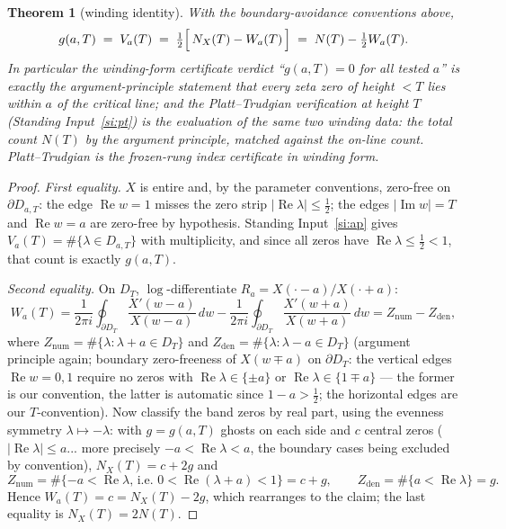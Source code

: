 \documentclass[11pt]{article}
\newtheorem{theorem}{Theorem}[section]
\theoremstyle{definition}
\theoremstyle{remark}
\newcommand{\re}{\operatorname{Re}}
\newcommand{\im}{\operatorname{Im}}
\begin{document}
\begin{theorem}[winding identity]\label{thm:winding-identity}
With the boundary-avoidance conventions above,
\[
g(a,T)\;=\;V_a(T)\;=\;\tfrac12\Bigl[\,N_X(T)-W_a(T)\,\Bigr]
\;=\;N(T)-\tfrac12 W_a(T).
\]
In particular the winding-form certificate verdict ``$g(a,T)=0$ for all
tested $a$'' is \emph{exactly} the argument-principle statement that every
zeta zero of height $<T$ lies within $a$ of the critical line; and the
Platt--Trudgian verification at height $T$ (Standing Input~\ref{si:pt}) is
the evaluation of the same two winding data: the total count $N(T)$ by the
argument principle, matched against the on-line count. Platt--Trudgian
\emph{is} the frozen-rung index certificate in winding form.
\end{theorem}

\begin{proof}
\emph{First equality.} $X$ is entire and, by the parameter conventions,
zero-free on $\partial D_{a,T}$: the edge $\re w=1$ misses the zero strip
$|\re\lambda|\le\tfrac12$; the edges $|\im w|=T$ and $\re w=a$ are zero-free
by hypothesis. Standing Input~\ref{si:ap} gives
$V_a(T)=\#\{\lambda\in D_{a,T}\}$ with multiplicity, and since all zeros have
$\re\lambda\le\tfrac12<1$, that count is exactly $g(a,T)$.

\emph{Second equality.} On $D_T$, $\log$-differentiate
$R_a=X(\cdot-a)/X(\cdot+a)$:
\[
W_a(T)=\frac{1}{2\pi i}\oint_{\partial D_T}\frac{X'(w-a)}{X(w-a)}\,dw
-\frac{1}{2\pi i}\oint_{\partial D_T}\frac{X'(w+a)}{X(w+a)}\,dw
=Z_{\mathrm{num}}-Z_{\mathrm{den}},
\]
where $Z_{\mathrm{num}}=\#\{\lambda:\lambda+a\in D_T\}$ and
$Z_{\mathrm{den}}=\#\{\lambda:\lambda-a\in D_T\}$ (argument principle again;
boundary zero-freeness of $X(w\mp a)$ on $\partial D_T$: the vertical edges
$\re w=0,1$ require no zeros with $\re\lambda\in\{\pm a\}$ or
$\re\lambda\in\{1\mp a\}$ --- the former is our convention, the latter is
automatic since $1-a>\tfrac12$; the horizontal edges are our $T$-convention).
Now classify the band zeros by real part, using the evenness symmetry
$\lambda\mapsto-\lambda$: with
$g=g(a,T)$ ghosts on each side and $c$ central zeros
($|\re\lambda|\le a$... more precisely $-a<\re\lambda<a$, the boundary cases
being excluded by convention), $N_X(T)=c+2g$ and
\[
Z_{\mathrm{num}}=\#\{-a<\re\lambda\text{, i.e. }0<\re(\lambda+a)<1\}=c+g,
\qquad
Z_{\mathrm{den}}=\#\{a<\re\lambda\}=g .
\]
Hence $W_a(T)=c=N_X(T)-2g$, which rearranges to the claim; the last equality
is $N_X(T)=2N(T)$.
\end{proof}
\end{document}
